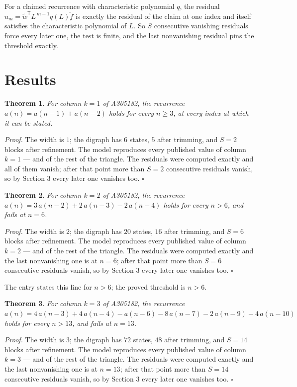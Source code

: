\documentclass[11pt]{article}
\newtheorem{theorem}{Theorem}
\theoremstyle{definition}
\begin{document}
For a claimed recurrence with characteristic polynomial $q$, the residual $u_m = \tilde w^{\mathsf T}L^{\,m-1}q(L)\tilde f$ is exactly the residual of the claim at one index and itself satisfies the characteristic polynomial of $L$. So $S$ consecutive vanishing residuals force every later one, the test is finite, and the last nonvanishing residual pins the threshold exactly.

\section{Results}

\begin{theorem} For column $k = 1$ of A305182, the recurrence $a(n) = a(n-1) + a(n-2)$ holds for every $n \ge 3$, at every index at which it can be stated.\end{theorem}

{\itshape Proof.} The width is $1$; the digraph has $6$ states, $5$ after trimming, and $S = 2$ blocks after refinement. The model reproduces every published value of column $k = 1$ --- and of the rest of the triangle. The residuals were computed exactly and all of them vanish; after that point more than $S = 2$ consecutive residuals vanish, so by Section 3 every later one vanishes too. $\square$

\begin{theorem} For column $k = 2$ of A305182, the recurrence $a(n) = 3\,a(n-2) + 2\,a(n-3) - 2\,a(n-4)$ holds for every $n > 6$, and fails at $n = 6$.\end{theorem}

{\itshape Proof.} The width is $2$; the digraph has $20$ states, $16$ after trimming, and $S = 6$ blocks after refinement. The model reproduces every published value of column $k = 2$ --- and of the rest of the triangle. The residuals were computed exactly and the last nonvanishing one is at $n = 6$; after that point more than $S = 6$ consecutive residuals vanish, so by Section 3 every later one vanishes too. $\square$

The entry states this line for $n > 6$; the proved threshold is $n > 6$.

\begin{theorem} For column $k = 3$ of A305182, the recurrence $a(n) = 4\,a(n-3) + 4\,a(n-4) - a(n-6) - 8\,a(n-7) - 2\,a(n-9) - 4\,a(n-10)$ holds for every $n > 13$, and fails at $n = 13$.\end{theorem}

{\itshape Proof.} The width is $3$; the digraph has $72$ states, $48$ after trimming, and $S = 14$ blocks after refinement. The model reproduces every published value of column $k = 3$ --- and of the rest of the triangle. The residuals were computed exactly and the last nonvanishing one is at $n = 13$; after that point more than $S = 14$ consecutive residuals vanish, so by Section 3 every later one vanishes too. $\square$
\end{document}
